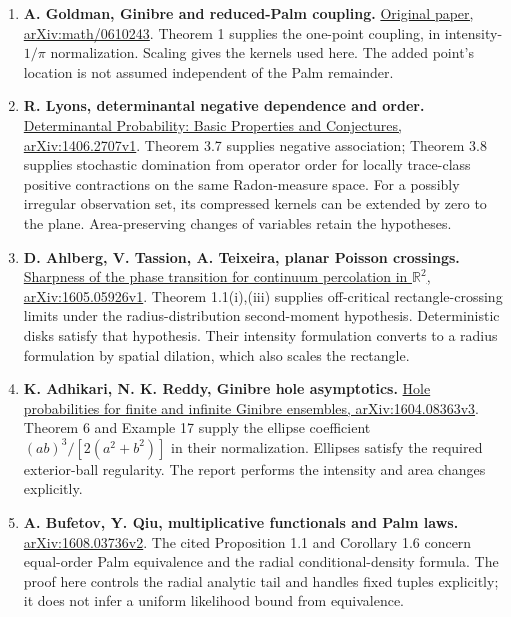 \documentclass[11pt,a4paper]{article}
\theoremstyle{definition}
\theoremstyle{remark}
\numberwithin{equation}{section}
\begin{document}
\begin{enumerate}[leftmargin=*]
\item \textbf{A. Goldman, Ginibre and reduced-Palm coupling.}
\href{https://arxiv.org/pdf/math/0610243}{Original paper, arXiv:math/0610243}.
Theorem 1 supplies the one-point coupling, in intensity-\(1/\pi\)
normalization. Scaling gives the kernels used here. The added point's
location is not assumed independent of the Palm remainder.

\item \textbf{R. Lyons, determinantal negative dependence and order.}
\href{https://arxiv.org/html/1406.2707v1}{Determinantal Probability:
Basic Properties and Conjectures, arXiv:1406.2707v1}.
Theorem 3.7 supplies negative association; Theorem 3.8 supplies stochastic
domination from operator order for locally trace-class positive
contractions on the same Radon-measure space. For a possibly irregular
observation set, its compressed kernels can be extended by zero to the
plane. Area-preserving changes of variables retain the hypotheses.

\item \textbf{D. Ahlberg, V. Tassion, A. Teixeira, planar Poisson crossings.}
\href{https://arxiv.org/html/1605.05926v1}{Sharpness of the phase
transition for continuum percolation in \(\mathbb R^2\),
arXiv:1605.05926v1}.
Theorem 1.1(i),(iii) supplies off-critical rectangle-crossing limits under
the radius-distribution second-moment hypothesis. Deterministic disks
satisfy that hypothesis. Their intensity formulation converts to a radius
formulation by spatial dilation, which also scales the rectangle.

\item \textbf{K. Adhikari, N. K. Reddy, Ginibre hole asymptotics.}
\href{https://arxiv.org/html/1604.08363v3}{Hole probabilities for finite
and infinite Ginibre ensembles, arXiv:1604.08363v3}.
Theorem 6 and Example 17 supply the ellipse coefficient
\((ab)^3/[2(a^2+b^2)]\) in their normalization. Ellipses satisfy the
required exterior-ball regularity. The report performs the intensity
and area changes explicitly.

\item \textbf{A. Bufetov, Y. Qiu, multiplicative functionals and Palm laws.}
\href{https://arxiv.org/html/1608.03736v2}{arXiv:1608.03736v2}.
The cited Proposition 1.1 and Corollary 1.6 concern equal-order Palm
equivalence and the radial conditional-density formula. The proof here
controls the radial analytic tail and handles fixed tuples explicitly;
it does not infer a uniform likelihood bound from equivalence.


\end{enumerate}
\end{document}
